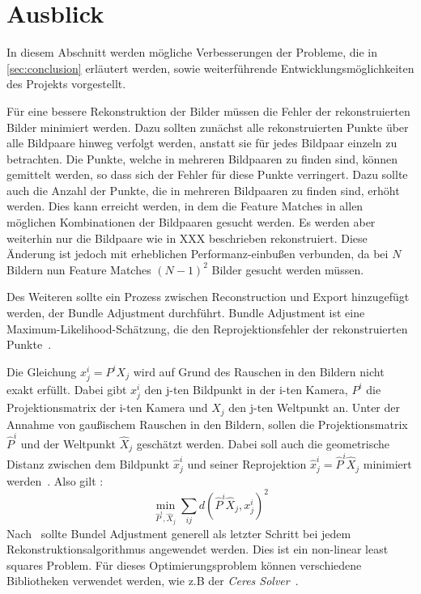 \chapter{Ausblick}
\label{sec:outlook}

In diesem Abschnitt werden mögliche Verbesserungen der Probleme, die in \cref{sec:conclusion} erläutert werden, sowie weiterführende Entwicklungsmöglichkeiten des Projekts vorgestellt.

Für eine bessere Rekonstruktion der Bilder müssen die Fehler der rekonstruierten Bilder minimiert werden.
Dazu sollten zunächst alle rekonstruierten Punkte über alle Bildpaare hinweg verfolgt werden, anstatt sie für jedes Bildpaar einzeln zu betrachten.
Die Punkte, welche in mehreren Bildpaaren zu finden sind, können gemittelt werden, so dass sich der Fehler für diese Punkte verringert.
Dazu sollte auch die Anzahl der Punkte, die in mehreren Bildpaaren zu finden sind, erhöht werden.
Dies kann erreicht werden, in dem die Feature Matches in allen möglichen Kombinationen der Bildpaaren gesucht werden.
Es werden aber weiterhin nur die Bildpaare wie in XXX beschrieben rekonstruiert.
Diese Änderung ist jedoch mit erheblichen Performanz-einbußen verbunden, da bei $N$ Bildern nun Feature Matches $(N-1)^2$ Bilder gesucht werden müssen. 

Des Weiteren sollte ein Prozess zwischen Reconstruction und Export hinzugefügt werden, der Bundle Adjustment durchführt. 
Bundle Adjustment ist eine Maximum-Likelihood-Schätzung, die den Reprojektionsfehler der rekonstruierten Punkte~\cite[Kapitel 18.1]{hartley_2003}.

Die Gleichung $x^i_j = P^iX_j$ wird auf Grund des Rauschen in den Bildern nicht exakt erfüllt.
Dabei gibt $x^i_j$ den j-ten Bildpunkt in der i-ten Kamera, $P^i$ die Projektionsmatrix der i-ten Kamera und $X_j$ den j-ten Weltpunkt an.
Unter der Annahme von gaußischem Rauschen in den Bildern, sollen die Projektionsmatrix $\hat{P}^i$ und der Weltpunkt $\hat{X}_j$ geschätzt werden.
Dabei soll auch die geometrische Distanz zwischen dem Bildpunkt $\hat{x}^i_j$ und seiner Reprojektion $\hat{x}^i_j = \hat{P}^i\hat{X}_j$ minimiert werden~\cite[Kapitel 18.1]{hartley_2003}.
Also gilt \cite[Equation 18.1]{hartley_2003}:
\[\min_{\hat{P}^i,\hat{X}_j}\sum_{ij}d(\hat{P}^i\hat{X}_j,x^i_j)^2\]
Nach~\cite[Kapitel 18.1]{hartley_2003} sollte Bundel Adjustment generell als letzter Schritt bei jedem Rekonstruktionsalgorithmus angewendet werden.
Dies ist ein non-linear least squares Problem. %
Für dieses Optimierungsproblem können verschiedene Bibliotheken verwendet werden, wie z.B der \emph{Ceres Solver}~\cite{ceres-solver}.
 
